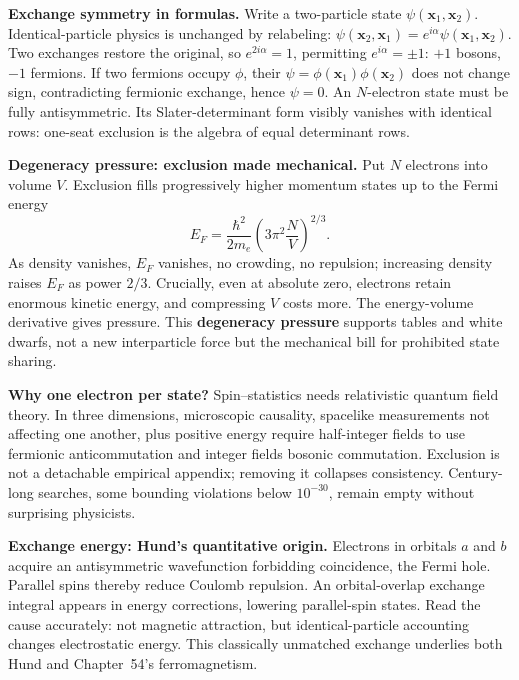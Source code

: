 \begin{mathbridge}
\textbf{Exchange symmetry in formulas.} Write a two-particle state \(\psi(\mathbf x_1,\mathbf x_2)\). Identical-particle physics is unchanged by relabeling: \(\psi(\mathbf x_2,\mathbf x_1)=e^{i\alpha}\psi(\mathbf x_1,\mathbf x_2)\). Two exchanges restore the original, so \(e^{2i\alpha}=1\), permitting \(e^{i\alpha}=\pm1\): \(+1\) bosons, \(-1\) fermions. If two fermions occupy \(\phi\), their \(\psi=\phi(\mathbf x_1)\phi(\mathbf x_2)\) does not change sign, contradicting fermionic exchange, hence \(\psi=0\). An \(N\)-electron state must be fully antisymmetric. Its Slater-determinant form visibly vanishes with identical rows: one-seat exclusion is the algebra of equal determinant rows.

\textbf{Degeneracy pressure: exclusion made mechanical.} Put \(N\) electrons into volume \(V\). Exclusion fills progressively higher momentum states up to the Fermi energy
\[
E_F=\frac{\hbar^2}{2m_e}\left(3\pi^2\frac{N}{V}\right)^{2/3}.
\]
As density vanishes, \(E_F\) vanishes, no crowding, no repulsion; increasing density raises \(E_F\) as power \(2/3\). Crucially, even at absolute zero, electrons retain enormous kinetic energy, and compressing \(V\) costs more. The energy-volume derivative gives pressure. This \textbf{degeneracy pressure} supports tables and white dwarfs, not a new interparticle force but the mechanical bill for prohibited state sharing.
\end{mathbridge}

\begin{challenge}
\textbf{Why one electron per state?} Spin--statistics needs relativistic quantum field theory. In three dimensions, microscopic causality, spacelike measurements not affecting one another, plus positive energy require half-integer fields to use fermionic anticommutation and integer fields bosonic commutation. Exclusion is not a detachable empirical appendix; removing it collapses consistency. Century-long searches, some bounding violations below \(10^{-30}\), remain empty without surprising physicists.

\textbf{Exchange energy: Hund's quantitative origin.} Electrons in orbitals \(a\) and \(b\) acquire an antisymmetric wavefunction forbidding coincidence, the Fermi hole. Parallel spins thereby reduce Coulomb repulsion. An orbital-overlap exchange integral appears in energy corrections, lowering parallel-spin states. Read the cause accurately: not magnetic attraction, but identical-particle accounting changes electrostatic energy. This classically unmatched exchange underlies both Hund and Chapter~54's ferromagnetism.
\end{challenge}

